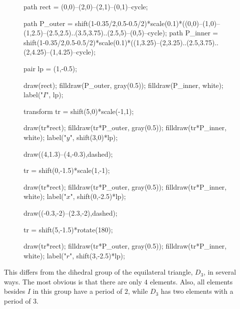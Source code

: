 \documentclass[../gatm_answers.tex]{subfiles}
\begin{document}
\begin{figure}[h]
	\begin{center}
		\begin{minipage}[b]{\textwidth}
			\centering
			\begin{asy}[width=0.5\textwidth]
			path rect = (0,0)--(2,0)--(2,1)--(0,1)--cycle;
			
			path P_outer = shift(1-0.35/2,0.5-0.5/2)*scale(0.1)*((0,0)--(1,0)--(1,2.5)--(2.5,2.5)..(3.5,3.75)..(2.5,5)--(0,5)--cycle);
			path P_inner = shift(1-0.35/2,0.5-0.5/2)*scale(0.1)*((1,3.25)--(2,3.25)..(2.5,3.75)..(2,4.25)--(1,4.25)--cycle);
			
			pair lp = (1,-0.5);
			
			draw(rect);
			filldraw(P_outer, gray(0.5));
			filldraw(P_inner, white);
			label("$I$", lp);
			
			transform tr = shift(5,0)*scale(-1,1);
			
			draw(tr*rect);
			filldraw(tr*P_outer, gray(0.5));
			filldraw(tr*P_inner, white);
			label("$y$", shift(3,0)*lp);
			
			draw((4,1.3)--(4,-0.3),dashed);
			
			tr = shift(0,-1.5)*scale(1,-1);
			
			draw(tr*rect);
			filldraw(tr*P_outer, gray(0.5));
			filldraw(tr*P_inner, white);
			label("$x$", shift(0,-2.5)*lp);
			
			draw((-0.3,-2)--(2.3,-2),dashed);
			
			tr = shift(5,-1.5)*rotate(180);
			
			draw(tr*rect);
			filldraw(tr*P_outer, gray(0.5));
			filldraw(tr*P_inner, white);
			label("$r$", shift(3,-2.5)*lp);
			\end{asy}
		\end{minipage}
	\end{center}
	\vspace*{-2\baselineskip}
	\begin{center}
		\begin{minipage}[t]{\textwidth}
			\label{fig:p_rectangle}
		\end{minipage}
	\end{center}
	\vspace*{-2\baselineskip}
\end{figure}

\noindent This differs from the dihedral group of the equilateral triangle, $D_3$, in several ways. The most obvious is that there are only $4$ elements. Also, all elements besides $I$ in this group have a period of $2$, while $D_3$ has two elements with a period of $3$.
\end{document}
